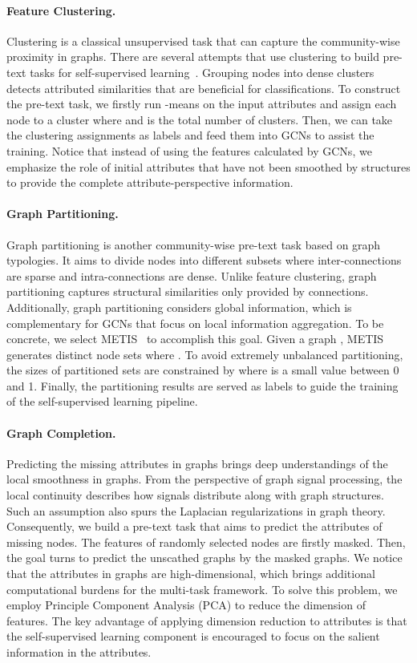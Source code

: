 \documentclass[letterpaper]{article} \usepackage{aaai22} \usepackage{times} \usepackage{helvet} \usepackage{courier} \usepackage[hyphens]{url} \usepackage{graphicx} \urlstyle{rm} \def\UrlFont{\rm} \usepackage{subfigure}
\begin{document}
	\paragraph{Feature Clustering.} Clustering is a classical unsupervised task that can capture the community-wise proximity in graphs. There are several attempts that use clustering to build pre-text tasks for self-supervised learning~\cite{Zhu2020MultiStageSS, Yuning2020Whendoes}. Grouping nodes into dense clusters detects attributed similarities that are beneficial for classifications. To construct the pre-text task, we firstly run -means on the input attributes and assign each node to a cluster  where  and  is the total number of clusters. Then, we can take the clustering assignments as labels and feed them into GCNs to assist the training. Notice that instead of using the features calculated by GCNs, we emphasize the role of initial attributes that have not been smoothed by structures to provide the complete attribute-perspective information.  
	
	\paragraph{Graph Partitioning.} Graph partitioning is another community-wise pre-text task based on graph typologies. It aims to divide nodes into different subsets where inter-connections are sparse and intra-connections are dense. Unlike feature clustering, graph partitioning captures structural similarities only provided by connections. Additionally, graph partitioning considers global information, which is complementary for GCNs that focus on local information aggregation. To be concrete, we select METIS~\cite{Karypis1998Partitioning} to accomplish this goal. Given a graph , METIS generates  distinct node sets  where . To avoid extremely unbalanced partitioning, the sizes of partitioned sets are constrained by  where  is a small value between 0 and 1. Finally, the partitioning results are served as labels to guide the training of the self-supervised learning pipeline. 
	
	\paragraph{Graph Completion.} Predicting the missing attributes in graphs brings deep understandings of the local smoothness in graphs. From the perspective of graph signal processing, the local continuity describes how signals distribute along with graph structures. Such an assumption also spurs the Laplacian regularizations in graph theory. Consequently, we build a pre-text task that aims to predict the attributes of missing nodes. The features of randomly selected nodes are firstly masked. Then, the goal turns to predict the unscathed graphs by the masked graphs. We notice that the attributes in graphs are high-dimensional, which brings additional computational burdens for the multi-task framework. To solve this problem, we employ Principle Component Analysis (PCA) to reduce the dimension of features. The key advantage of applying dimension reduction to attributes is that the self-supervised learning component is encouraged to focus on the salient information in the attributes.
	
\end{document}

